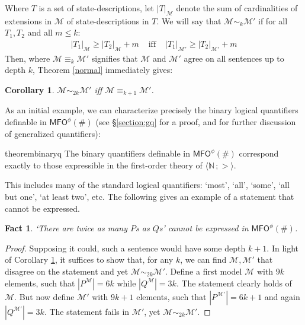 \documentclass[12pt,oneside,reqno]{amsart}
\newtheorem{fact}{Fact}
\newtheorem{corollary}{Corollary}
\theoremstyle{definition}
\newtheorem{example}{Example}
\begin{document}
Where $T$ is a set of state-descriptions, let $|T|_\mathcal{M}$ denote the sum of cardinalities of extensions in $\mathcal{M}$ of state-descriptions in $T$. We will say that $\mathcal{M} \sim_k \mathcal{M}'$ if for all $T_1,T_2$ and all $m \leq k$: \vspace{0.5mm} \begin{eqnarray*} |T_1|_\mathcal{M} \geq |T_2|_{\mathcal{M}} + m & \mbox{ iff } & |T_1|_{\mathcal{M}'} \geq |T_2|_{\mathcal{M}'} + m \end{eqnarray*} \vspace{0.5mm} Then, where $\mathcal{M} \equiv_k \mathcal{M}'$ signifies that $\mathcal{M}$ and $\mathcal{M}'$ agree on all sentences up to depth $k$, Theorem \ref{normal} immediately gives:\vspace{0.5mm} 
\begin{corollary} $\mathcal{M} \sim_{2k} \mathcal{M'}$ iff $\mathcal{M} \equiv_{k+1} \mathcal{M}'$. \label{undefinability}
\end{corollary} As an initial example, we can characterize precisely the binary logical quantifiers definable in $\mathsf{MFO}^\phi(\#)$ (see \S\ref{section:gq} for a proof, and for further discussion of generalized quantifiers):\vspace{0.5mm}
\begin{restatable}{theorem}{binaryq} The binary quantifiers definable in $\mathsf{MFO}^\phi(\#)$ correspond exactly to  those expressible in the first-order theory of $\langle\mathbb{N}\,;>\rangle$. \label{binary-quant}\vspace{0.5mm}
\end{restatable} This includes many of the standard logical quantifiers: `most', `all', `some', `all but one', `at least two', etc. %
The following gives an example of a statement that cannot be expressed. 
\begin{fact} \emph{`There are twice as many $P$s as $Q$s'} cannot be expressed in $\mathsf{MFO}^\phi(\#)$. \label{fact:twice}
\end{fact}
\begin{proof} Supposing it could, such a sentence would have some depth $k+1$. In light of Corollary \ref{undefinability}, it suffices to show that, for any $k$, we can find $\mathcal{M},\mathcal{M}'$ that disagree on the statement and yet $\mathcal{M} \sim_{2k} \mathcal{M}'$. Define a first model $\mathcal{M}$ with $9k$ elements, such that $|P^{\mathcal{M}}| = 6k$ while $|Q^{\mathcal{M}}| = 3k$. The statement clearly holds of $\mathcal{M}$. But now define $\mathcal{M'}$ with $9k+1$ elements, such that $|P^{\mathcal{M}'}| = 6k+1$ and again $|Q^{\mathcal{M}'}| = 3k$. The statement fails in $\mathcal{M}'$, yet  $\mathcal{M} \sim_{2k} \mathcal{M}'$.
\end{proof}
\end{document}
